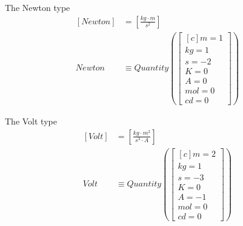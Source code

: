 \documentclass{beamer}
\begin{document}
\begin{frame}[fragile]
  The Newton type
  \begin{align*}
    \left[ Newton \right] & = \left[ \frac{kg \cdot m}{s^2} \right] \\
    Newton & \equiv Quantity\left( \begin{bmatrix*}[c] m = 1 \\ kg = 1 \\ s = -2 \\ K = 0 \\ A = 0 \\ mol = 0 \\ cd = 0 \end{bmatrix*} \right) 
  \end{align*}
\end{frame}

\begin{frame}[fragile]
  The Volt type
  \begin{align*}
    \left[ Volt \right] & = \left[ \frac{kg \cdot m^2}{s^3 \cdot A} \right] \\
    Volt & \equiv Quantity\left( \begin{bmatrix*}[c] m = 2 \\ kg = 1 \\ s = -3 \\ K = 0 \\ A = -1 \\ mol = 0 \\ cd = 0\end{bmatrix*} \right) 
  \end{align*}
\end{frame}

\end{document}
